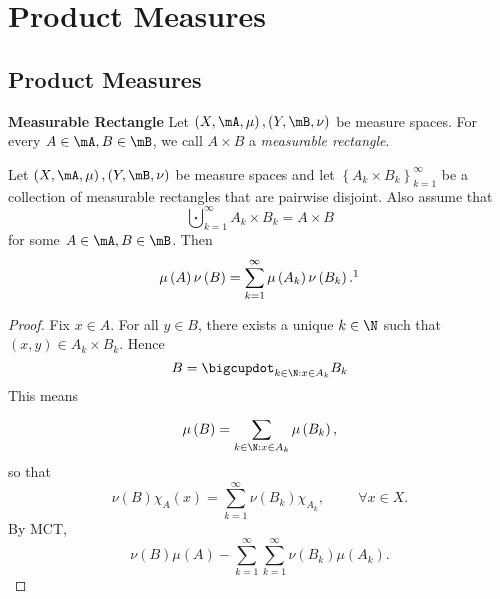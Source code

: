 \documentclass[pmath451]{subfiles}
\begin{document}
    \section{Product Measures}
    
    \subsection{Product Measures}

    \begin{definition}{\textbf{Measurable Rectangle}}
        Let $\left( X,\mA,\mu \right),\left( Y,\mB,\nu \right)$ be measure spaces. For every $A\in\mA,B\in\mB$, we call $A\times B$ a \emph{measurable rectangle}.
    \end{definition}
    
    \begin{lemma}{}
        Let $\left( X,\mA,\mu \right),\left( Y,\mB,\nu \right)$ be measure spaces and let $\left\lbrace A_k\times B_k \right\rbrace^{\infty}_{k=1}$ be a collection of measurable rectangles that are pairwise disjoint. Also assume that
        \begin{equation*}
            \bigcupdot^{\infty}_{k=1} A_k\times B_k = A\times B
        \end{equation*}
        for some $A\in\mA,B\in\mB$. Then
        \begin{equation*}
            \mu\left( A \right)\nu\left( B \right) = \sum^{\infty}_{k=1} \mu\left( A_k \right)\nu\left( B_k \right).\footnotemark[1]
        \end{equation*}
        
        \noindent
        \begin{minipage}{\textwidth}
        \end{minipage}
    \end{lemma}
    
    \begin{proof}
        Fix $x\in A$. For all $y\in B$, there exists a unique $k\in\N$ such that $\left( x,y \right)\in A_k\times B_k$. Hence
        \begin{equation*}
            B = \bigcupdot^{}_{k\in\N:x\in A_k} B_k
        \end{equation*}
        This means
        \begin{equation*}
            \mu\left( B \right) = \sum^{}_{k\in\N:x\in A_k} \mu\left( B_k \right),
        \end{equation*}
        so that
        \begin{equation*}
            \nu\left( B \right)\chi_A\left( x \right) = \sum^{\infty}_{k=1}\nu\left( B_k \right)\chi_{A_k},\hspace{1cm}\forall x\in X.
        \end{equation*}
        By MCT,
        \begin{equation*}
            \nu\left( B \right)\mu\left( A \right) - \sum^{\infty}_{k=1} \sum^{\infty}_{k=1}\nu\left( B_k \right)\mu\left( A_k \right).
        \end{equation*}
    \end{proof}
    
\end{document}
